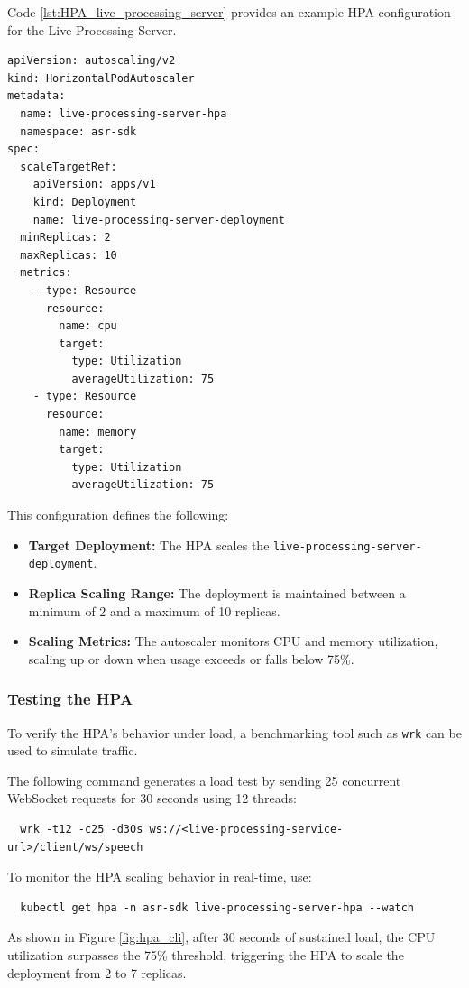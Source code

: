 Code \ref{lst:HPA_live_processing_server} provides an example HPA configuration for the Live Processing Server.


\begin{lstlisting}[language=Kubernetes, caption={Horizontal Pod Autoscaler for Live Processing Server}, label={lst:HPA_live_processing_server}]
apiVersion: autoscaling/v2
kind: HorizontalPodAutoscaler
metadata:
  name: live-processing-server-hpa
  namespace: asr-sdk
spec:
  scaleTargetRef:
    apiVersion: apps/v1
    kind: Deployment
    name: live-processing-server-deployment
  minReplicas: 2
  maxReplicas: 10
  metrics:
    - type: Resource
      resource:
        name: cpu
        target:
          type: Utilization
          averageUtilization: 75
    - type: Resource
      resource:
        name: memory
        target:
          type: Utilization
          averageUtilization: 75
\end{lstlisting}

This configuration defines the following:
\begin{itemize}
    \item \textbf{Target Deployment:} The HPA scales the \texttt{live-processing-server-deployment}.
    \item \textbf{Replica Scaling Range:} The deployment is maintained between a minimum of 2 and a maximum of 10 replicas.
    \item \textbf{Scaling Metrics:} The autoscaler monitors CPU and memory utilization, scaling up or down when usage exceeds or falls below 75\%.
\end{itemize}
\subsubsection{Testing the HPA}
To verify the HPA's behavior under load, a benchmarking tool such as \texttt{wrk} can be used to simulate traffic.

The following command generates a load test by sending 25 concurrent WebSocket requests for 30 seconds using 12 threads:
\begin{verbatim}
  wrk -t12 -c25 -d30s ws://<live-processing-service-url>/client/ws/speech
\end{verbatim}

To monitor the HPA scaling behavior in real-time, use:
\begin{verbatim}
  kubectl get hpa -n asr-sdk live-processing-server-hpa --watch
\end{verbatim}

As shown in Figure \ref{fig:hpa_cli}, after 30 seconds of sustained load, the CPU utilization surpasses the 75\% threshold, triggering the HPA to scale the deployment from 2 to 7 replicas.

